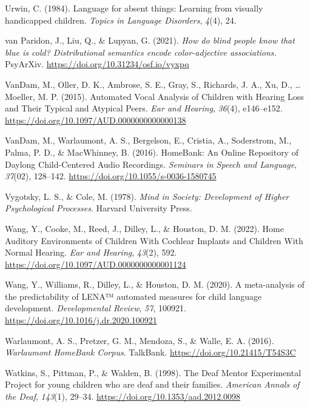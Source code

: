\documentclass[
  man,floatsintext]{apa6}
\newlength{\cslhangindent}
\newlength{\cslentryspacingunit} %
\newenvironment{CSLReferences}[2] %
 {%
  \setlength{\parindent}{0pt}
  \ifodd #1
  \let\oldpar\par
  \def\par{\hangindent=\cslhangindent\oldpar}
  \fi
  \setlength{\parskip}{#2\cslentryspacingunit}
 }%
 {}
\begin{document}
\begin{CSLReferences}{1}{0}
\leavevmode{}%
Urwin, C. (1984). Language for absent things: Learning from visually handicapped children. \emph{Topics in Language Disorders}, \emph{4}(4), 24.

\leavevmode{}%
van Paridon, J., Liu, Q., \& Lupyan, G. (2021). \emph{How do blind people know that blue is cold? {Distributional} semantics encode color-adjective associations.} PsyArXiv. \url{https://doi.org/10.31234/osf.io/vyxpq}

\leavevmode{}%
VanDam, M., Oller, D. K., Ambrose, S. E., Gray, S., Richards, J. A., Xu, D., \ldots{} Moeller, M. P. (2015). Automated {Vocal Analysis} of {Children} with {Hearing Loss} and {Their Typical} and {Atypical Peers}. \emph{Ear and Hearing}, \emph{36}(4), e146--e152. \url{https://doi.org/10.1097/AUD.0000000000000138}

\leavevmode{}%
VanDam, M., Warlaumont, A. S., Bergelson, E., Cristia, A., Soderstrom, M., Palma, P. D., \& MacWhinney, B. (2016). {HomeBank}: {An Online Repository} of {Daylong Child-Centered Audio Recordings}. \emph{Seminars in Speech and Language}, \emph{37}(02), 128--142. \url{https://doi.org/10.1055/s-0036-1580745}

\leavevmode{}%
Vygotsky, L. S., \& Cole, M. (1978). \emph{Mind in {Society}: {Development} of {Higher Psychological Processes}}. Harvard University Press.

\leavevmode{}%
Wang, Y., Cooke, M., Reed, J., Dilley, L., \& Houston, D. M. (2022). Home {Auditory Environments} of {Children With Cochlear Implants} and {Children With Normal Hearing}. \emph{Ear and Hearing}, \emph{43}(2), 592. \url{https://doi.org/10.1097/AUD.0000000000001124}

\leavevmode{}%
Wang, Y., Williams, R., Dilley, L., \& Houston, D. M. (2020). A meta-analysis of the predictability of {LENA}™ automated measures for child language development. \emph{Developmental Review}, \emph{57}, 100921. \url{https://doi.org/10.1016/j.dr.2020.100921}

\leavevmode{}%
Warlaumont, A. S., Pretzer, G. M., Mendoza, S., \& Walle, E. A. (2016). \emph{Warlaumont {HomeBank Corpus}}. TalkBank. \url{https://doi.org/10.21415/T54S3C}

\leavevmode{}%
Watkins, S., Pittman, P., \& Walden, B. (1998). The {Deaf Mentor Experimental Project} for young children who are deaf and their families. \emph{American Annals of the Deaf}, \emph{143}(1), 29--34. \url{https://doi.org/10.1353/aad.2012.0098}


\end{CSLReferences}
\end{document}
